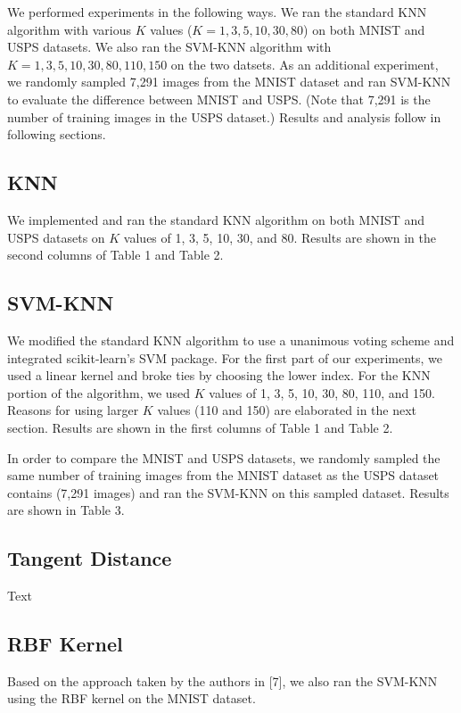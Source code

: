 \documentclass[11pt,letterpaper]{article}
\begin{document}
We performed experiments in the following ways. We ran the standard KNN algorithm with various $K$ values ($K=1,3,5,10,30,80$) on both MNIST and USPS datasets. We also ran the SVM-KNN algorithm with $K=1,3,5,10,30,80,110,150$ on the two datsets. As an additional experiment, we randomly sampled 7,291 images from the MNIST dataset and ran SVM-KNN to evaluate the difference between MNIST and USPS. (Note that 7,291 is the number of training images in the USPS dataset.) Results and analysis follow in following sections.

\subsection{KNN}

We implemented and ran the standard KNN algorithm on both MNIST and USPS datasets on $K$ values of 1, 3, 5, 10, 30, and 80. Results are shown in the second columns of Table 1 and Table 2.

\subsection{SVM-KNN}

We modified the standard KNN algorithm to use a unanimous voting scheme and integrated scikit-learn's SVM package. For the first part of our experiments, we used a linear kernel and broke ties by choosing the lower index. For the KNN portion of the algorithm, we used $K$ values of 1, 3, 5, 10, 30, 80, 110, and 150. Reasons for using larger $K$ values (110 and 150) are elaborated in the next section. Results are shown in the first columns of Table 1 and Table 2.

In order to compare the MNIST and USPS datasets, we randomly sampled the same number of training images from the MNIST dataset as the USPS dataset contains (7,291 images) and ran the SVM-KNN on this sampled dataset. Results are shown in Table 3.

\subsection{Tangent Distance}

Text

\subsection{RBF Kernel}

Based on the approach taken by the authors in [7], we also ran the SVM-KNN using the RBF kernel on the MNIST dataset.
\end{document}
